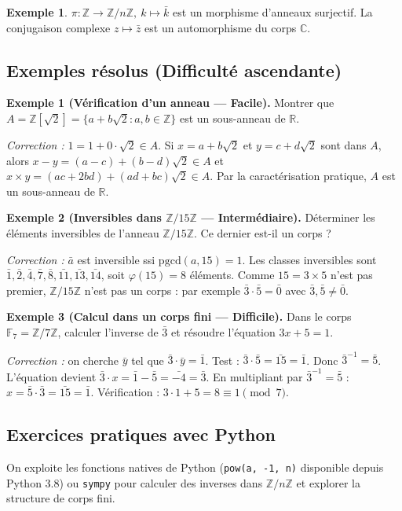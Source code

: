 \documentclass[12pt,a4paper]{report}
\theoremstyle{definition}
\newtheorem{exemple}{Exemple}[section]
\theoremstyle{remark}
\begin{document}
\begin{exemple}
$\pi : \mathbb{Z} \to \mathbb{Z}/n\mathbb{Z},\ k \mapsto \bar{k}$ est un morphisme d'anneaux surjectif.
La conjugaison complexe $z \mapsto \bar{z}$ est un automorphisme du corps $\mathbb{C}$.
\end{exemple}

\subsection{Exemples résolus (Difficulté ascendante)}

\textbf{Exemple 1 (Vérification d'un anneau --- Facile).}
Montrer que $A = \mathbb{Z}[\sqrt{2}] = \{a + b\sqrt{2} : a, b \in \mathbb{Z}\}$ est un sous-anneau de $\mathbb{R}$.

\textit{Correction :} $1 = 1 + 0 \cdot \sqrt{2} \in A$. Si $x = a + b\sqrt{2}$ et $y = c + d\sqrt{2}$ sont dans $A$, alors $x - y = (a-c) + (b-d)\sqrt{2} \in A$ et $x \times y = (ac + 2bd) + (ad + bc)\sqrt{2} \in A$. Par la caractérisation pratique, $A$ est un sous-anneau de $\mathbb{R}$.

\medskip

\textbf{Exemple 2 (Inversibles dans $\mathbb{Z}/15\mathbb{Z}$ --- Intermédiaire).}
Déterminer les éléments inversibles de l'anneau $\mathbb{Z}/15\mathbb{Z}$. Ce dernier est-il un corps ?

\textit{Correction :} $\bar{a}$ est inversible ssi $\mathrm{pgcd}(a, 15) = 1$. Les classes inversibles sont $\bar{1}, \bar{2}, \bar{4}, \bar{7}, \bar{8}, \bar{11}, \bar{13}, \bar{14}$, soit $\varphi(15) = 8$ éléments. Comme $15 = 3 \times 5$ n'est pas premier, $\mathbb{Z}/15\mathbb{Z}$ n'est pas un corps : par exemple $\bar{3} \cdot \bar{5} = \bar{0}$ avec $\bar{3}, \bar{5} \neq \bar{0}$.

\medskip

\textbf{Exemple 3 (Calcul dans un corps fini --- Difficile).}
Dans le corps $\mathbb{F}_7 = \mathbb{Z}/7\mathbb{Z}$, calculer l'inverse de $\bar{3}$ et résoudre l'équation $3x + 5 = 1$.

\textit{Correction :} on cherche $\bar{y}$ tel que $\bar{3} \cdot \bar{y} = \bar{1}$. Test : $\bar{3} \cdot \bar{5} = \bar{15} = \bar{1}$. Donc $\bar{3}^{-1} = \bar{5}$.
L'équation devient $\bar{3} \cdot x = \bar{1} - \bar{5} = \bar{-4} = \bar{3}$. En multipliant par $\bar{3}^{-1} = \bar{5}$ : $x = \bar{5} \cdot \bar{3} = \bar{15} = \bar{1}$.
Vérification : $3 \cdot 1 + 5 = 8 \equiv 1 \pmod{7}$. \checkmark

\subsection{Exercices pratiques avec Python}
On exploite les fonctions natives de Python (\texttt{pow(a, -1, n)} disponible depuis Python 3.8) ou \texttt{sympy} pour calculer des inverses dans $\mathbb{Z}/n\mathbb{Z}$ et explorer la structure de corps fini.
\end{document}
